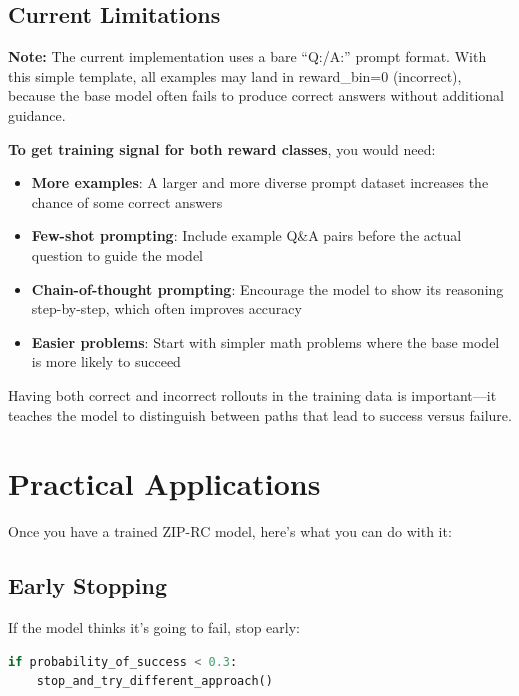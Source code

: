 \documentclass[11pt,a4paper]{article}
\begin{document}
\subsection{Current Limitations}

\textbf{Note:} The current implementation uses a bare ``Q:/A:'' prompt format. With this simple template, all examples may land in reward\_bin=0 (incorrect), because the base model often fails to produce correct answers without additional guidance.

\textbf{To get training signal for both reward classes}, you would need:
\begin{itemize}
    \item \textbf{More examples}: A larger and more diverse prompt dataset increases the chance of some correct answers
    \item \textbf{Few-shot prompting}: Include example Q\&A pairs before the actual question to guide the model
    \item \textbf{Chain-of-thought prompting}: Encourage the model to show its reasoning step-by-step, which often improves accuracy
    \item \textbf{Easier problems}: Start with simpler math problems where the base model is more likely to succeed
\end{itemize}

Having both correct and incorrect rollouts in the training data is important---it teaches the model to distinguish between paths that lead to success versus failure.

\section{Practical Applications}

Once you have a trained ZIP-RC model, here's what you can do with it:

\subsection{Early Stopping}

If the model thinks it's going to fail, stop early:

\begin{lstlisting}[language=Python]
if probability_of_success < 0.3:
    stop_and_try_different_approach()
\end{lstlisting}
\end{document}
